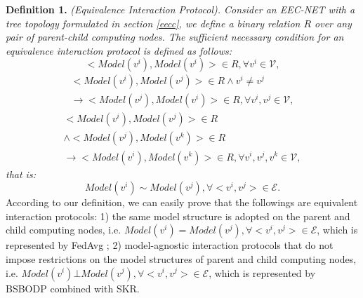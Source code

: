 \documentclass[10pt,journal]{IEEEtran}
\begin{document}
\noindent
\textbf{Definition 1.} \textit{(Equivalence Interaction Protocol). Consider an EEC-NET with a tree topology formulated in section \ref{eecc}, we define a binary relation $R$ over any pair of parent-child computing nodes.
The sufficient necessary condition for an equivalence interaction protocol is defined as follows:}
\begin{equation}
    < Model({v^i}),Model({v^i}) >  \in R,\forall {v^i} \in \mathcal{V},
\end{equation}
\begin{equation}
    \begin{array}{l}
 < Model({v^i}),Model({v^j}) >  \in R \wedge {v^i} \ne {v^j}\\
 \to  < Model({v^j}),Model({v^i}) >  \in R,\forall {v^i},{v^j} \in \mathcal{V},
\end{array}
\end{equation}
\begin{equation}
\begin{array}{l}
 < Model({v^i}),Model({v^j}) >  \in R\\
 \wedge  < Model({v^j}),Model({v^k}) >  \in R\\
 \to  < Model({v^i}),Model({v^k}) >  \in R,\forall {v^i},{v^j},{v^k} \in \mathcal{V},
\end{array}
\end{equation}
\textit{that is:}
\begin{equation}
   Model(v^i) \sim Model(v^j),\forall <v^i,v^j>\in \mathcal{E}.
\end{equation}
According to our definition, we can easily prove that the followings are equivalent interaction protocols: 1) the same model structure is adopted on the parent and child computing nodes, i.e. $Model(v^i) = Model(v^j),\forall <v^i,v^j>\in \mathcal{E}$, which is represented by FedAvg \cite{mcmahan2017communication}; 
2) model-agnostic interaction protocols that do not impose restrictions on the model structures of parent and child computing nodes, i.e. $Model(v^i) \bot Model(v^j),\forall <v^i,v^j>\in \mathcal{E}$, which is represented by BSBODP combined with SKR.
\end{document}
